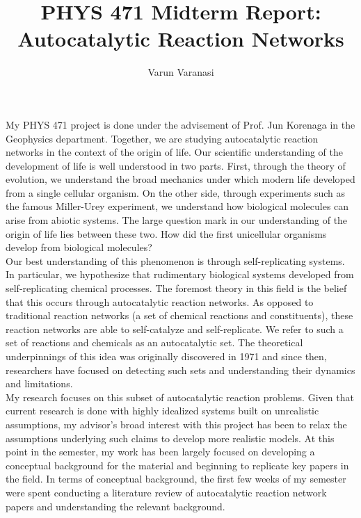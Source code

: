 \documentclass[12pt]{article}
\title{PHYS 471 Midterm Report: Autocatalytic Reaction Networks}
\author{Varun Varanasi}
\begin{document}
\maketitle

My PHYS 471 project is done under the advisement of  Prof. Jun Korenaga in the Geophysics department. Together, we are studying autocatalytic reaction networks in the context of the origin of life. Our scientific understanding of the development of life is well understood in two parts. First, through the theory of evolution, we understand the broad mechanics under which modern life developed from a single cellular organism. On the other side, through experiments such as the famous Miller-Urey experiment, we understand how biological molecules can arise from abiotic systems. The large question mark in our understanding of the origin of life lies between these two. How did the first unicellular organisms develop from biological molecules? \\

Our best understanding of this phenomenon is through self-replicating systems. In particular, we hypothesize that rudimentary biological systems developed from self-replicating chemical processes. The foremost theory in this field is the belief that this occurs through autocatalytic reaction networks. As opposed to traditional reaction networks (a set of chemical reactions and constituents), these reaction networks are able to self-catalyze and self-replicate. We refer to such a set of reactions and chemicals as an autocatalytic set. The theoretical underpinnings of this idea was originally discovered in 1971 and since then, researchers have focused on detecting such sets and understanding their dynamics and limitations. \\

My research focuses on this subset of autocatalytic reaction problems. Given that current research is done with highly idealized systems built on unrealistic assumptions, my advisor’s broad interest with this project has been to relax the assumptions underlying such claims to develop more realistic models. At this point in the semester, my work has been largely focused on developing a conceptual background for the material and beginning to replicate key papers in the field. In terms of conceptual background, the first few weeks of my semester were spent conducting a literature review of autocatalytic reaction network papers and understanding the relevant background. \\
\end{document}
